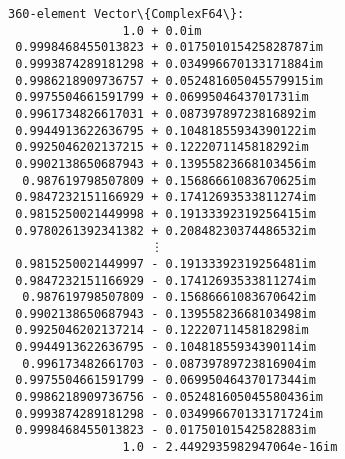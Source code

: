 \documentclass[11pt]{article}
\makeatletter
\newcommand{\boxspacing}{\kern\kvtcb@left@rule\kern\kvtcb@boxsep}
\newcommand{\prompt}[4]{
        {\ttfamily\llap{{\color{#2}[#3]:\hspace{3pt}#4}}\vspace{-\baselineskip}}
    }
\makeatother
\begin{document}
            \begin{tcolorbox}[breakable, size=fbox, boxrule=.5pt, pad at break*=1mm, opacityfill=0]
\prompt{Out}{outcolor}{6}{\boxspacing}
\begin{Verbatim}[commandchars=\\\{\}]
360-element Vector\{ComplexF64\}:
                1.0 + 0.0im
 0.9998468455013823 + 0.017501015425828787im
 0.9993874289181298 + 0.034996670133171884im
 0.9986218909736757 + 0.052481605045579915im
 0.9975504661591799 + 0.0699504643701731im
 0.9961734826617031 + 0.08739789723816892im
 0.9944913622636795 + 0.10481855934390122im
 0.9925046202137215 + 0.1222071145818292im
 0.9902138650687943 + 0.13955823668103456im
  0.987619798507809 + 0.15686661083670625im
 0.9847232151166929 + 0.17412693533811274im
 0.9815250021449998 + 0.19133392319256415im
 0.9780261392341382 + 0.20848230374486532im
                    ⋮
 0.9815250021449997 - 0.19133392319256481im
 0.9847232151166929 - 0.17412693533811274im
  0.987619798507809 - 0.15686661083670642im
 0.9902138650687943 - 0.13955823668103498im
 0.9925046202137214 - 0.1222071145818298im
 0.9944913622636795 - 0.10481855934390114im
  0.996173482661703 - 0.08739789723816904im
 0.9975504661591799 - 0.06995046437017344im
 0.9986218909736756 - 0.052481605045580436im
 0.9993874289181298 - 0.034996670133171724im
 0.9998468455013823 - 0.01750101542582883im
                1.0 - 2.4492935982947064e-16im
\end{Verbatim}
\end{tcolorbox}
        
\end{document}
